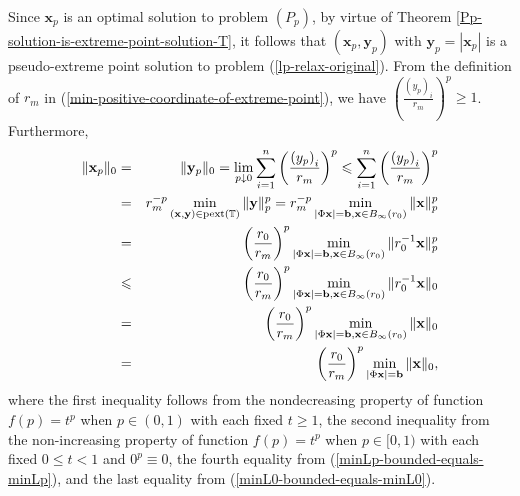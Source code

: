 \documentclass[12pt]{article}
\begin{document}
Since ${\mathbf{x}}_p$ is an optimal solution to problem $(P_p)$, by virtue of Theorem {\rm\ref{Pp-solution-is-extreme-point-solution-T}}, it follows that $({\mathbf{x}}_p,{\mathbf{y}}_p)$ with ${\mathbf{y}}_p=|{\mathbf{x}}_p|$ is a pseudo-extreme point solution to problem (\ref{lp-relax-original}).
From the definition of $r_m$ in (\ref{min-positive-coordinate-of-extreme-point}), we have $\left(\frac{{(y_p)}_i}{r_m}\right)^{p}\geqslant 1$.
Furthermore,
\begin{eqnarray}\label{find-pstar}
 \|{\mathbf{x}}_p\|_{0}
 &=&\|{\mathbf{y}}_p\|_{0} =\lim\limits_{p\downarrow0}\sum\limits_{i=1}^{n}\left(\frac{{(y_p)}_i}{r_m}\right)^{p}
 \leqslant\sum\limits_{i=1}^{n}\left(\frac{{(y_p)}_i}{r_m}\right)^{p}\nonumber\\
&=& r_m^{-p}\min\limits_{{(\mathbf{x},\mathbf{y})\in{\rm pext\left(\mathbb{T}\right)}}}\|\mathbf{y}\|^{p}_{p}
= r_m^{-p}\min\limits_{|\Phi\mathbf{x}|=\mathbf{b},\mathbf{x}\in B_{\infty}(r_0)}\|\mathbf{x}\|^{p}_{p}\nonumber\\
&=&\left(\frac{r_0}{r_m}\right)^{p} \min\limits_{|\Phi\mathbf{x}|=\mathbf{b},\mathbf{x}\in B_{\infty}(r_0)}\|r_0^{-1}\mathbf{x}\|^{p}_{p}\nonumber\\
&\leqslant &\left (\frac{r_0}{r_m}\right )^{p} \min\limits_{|\Phi\mathbf{x}|=\mathbf{b},\mathbf{x}\in B_{\infty}(r_0)}\|r_0^{-1}\mathbf{x}\|_{0}\nonumber\\
&=&\left(\frac{r_0}{r_m}\right)^{p}\min\limits_{|\Phi\mathbf{x}|=\mathbf{b},\mathbf{x}\in B_{\infty}(r_0)}\|\mathbf{x}\|_{0}\nonumber\\
&=&\left(\frac{r_0}{r_m}\right)^{p}\min\limits_{|\Phi\mathbf{x}|=\mathbf{b}}\|\mathbf{x}\|_{0},
\end{eqnarray}
where the first inequality follows from the nondecreasing property of function $f(p)=t^p$ when $p\in(0,1)$ with each fixed $ t\geqslant1$,
the second inequality from the non-increasing property of function $f(p)=t^p$ when $p\in [0,1)$ with each fixed $0\leqslant t<1$ and $0^p\equiv0$,
the fourth equality from (\ref{minLp-bounded-equals-minLp}), and
the last equality from (\ref{minL0-bounded-equals-minL0}).
\end{document}
